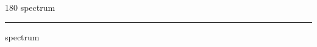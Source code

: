 
\begin{frame}
\begin{center}
\begin{turn}{180}
{\fontsize{2.5cm}{1em}\selectfont spectrum}
\end{turn}
\vspace{1em}\par  
\hrule
\vspace{1em}\par  
{\fontsize{2.5cm}{1em}\selectfont spectrum}
\end{center}
\end{frame}
